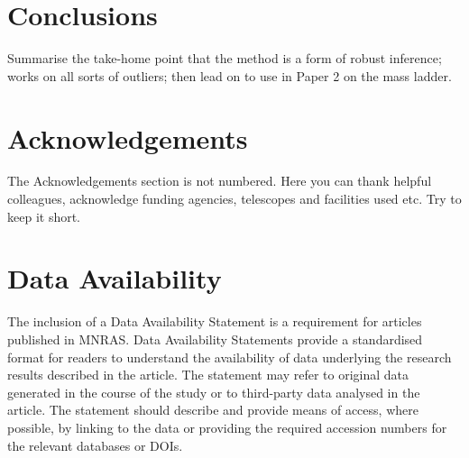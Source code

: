 \documentclass[fleqn,usenatbib]{mnras}
\begin{document}
\section{Conclusions}

Summarise the take-home point that the method is a form of robust inference;
works on all sorts of outliers; then lead on to use in Paper 2 on the mass
ladder.

\section*{Acknowledgements}

The Acknowledgements section is not numbered. Here you can thank helpful
colleagues, acknowledge funding agencies, telescopes and facilities used etc.
Try to keep it short.

\section*{Data Availability}


The inclusion of a Data Availability Statement is a requirement for articles
published in MNRAS. Data Availability Statements provide a standardised format
for readers to understand the availability of data underlying the research
results described in the article. The statement may refer to original data
generated in the course of the study or to third-party data analysed in the
article. The statement should describe and provide means of access, where
possible, by linking to the data or providing the required accession numbers for
the relevant databases or DOIs.










\end{document}

